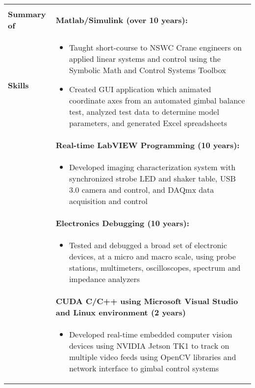 \begin{tabular}{L{\hlcolw}  L{\rcolw}}
\hline \hline \\
\textbf{\Large Summary of } & 
\textbf{Matlab/Simulink (over 10 years):} 
\\
\textbf{\Large Skills} & 
\vspace{-0.25in}
\begin{itemize}[leftmargin = \itemmargin]
\item Taught short-course to NSWC Crane engineers on applied linear systems and control using the Symbolic Math and Control Systems Toolbox
\item Created GUI application which animated coordinate axes from an automated gimbal balance test, analyzed test data to determine model parameters, and generated Excel spreadsheets

\end{itemize} \\
& \textbf{Real-time LabVIEW Programming (10 years):} \\
& \vspace{-0.25in}
\begin{itemize}[leftmargin = \itemmargin]
\item Developed imaging characterization system with synchronized strobe LED and shaker table, USB 3.0 camera and control, and DAQmx data acquisition and control
\end{itemize} \\

& \textbf{Electronics Debugging (10 years):} \\
&
\vspace{-0.25in}
\begin{itemize}[leftmargin = \itemmargin]
\item Tested and debugged a broad set of electronic devices, at a micro and macro scale, using probe stations, multimeters, oscilloscopes, spectrum and impedance analyzers
\end{itemize}
\\

& \textbf{CUDA C/C++ using Microsoft Visual Studio and Linux environment (2 years)}\\
&
\vspace{-0.25in}
\begin{itemize}[leftmargin = \itemmargin]
\item Developed real-time embedded computer vision devices using NVIDIA Jetson TK1 to track on multiple video feeds using OpenCV libraries and network interface to gimbal control systems
\end{itemize} \\


\end{tabular}
